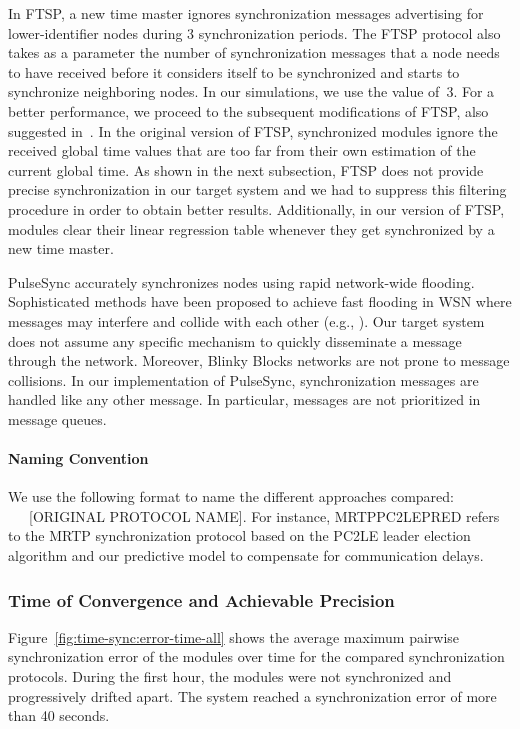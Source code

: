 In FTSP, a new time master ignores synchronization messages advertising for lower-identifier nodes during 3 synchronization periods. The FTSP protocol also takes as a parameter the number of synchronization messages that a node needs to have received before it considers itself to be synchronized and starts to synchronize neighboring nodes. In our simulations, we use the value of~3. For a better performance, we proceed to the subsequent modifications of FTSP, also suggested in~\cite{lenzen2009optimal}. In the original version of FTSP, synchronized modules ignore the received global time values that are too far from their own estimation of the current global time. As shown in the next subsection, FTSP does not provide precise synchronization in our target system and we had to suppress this filtering procedure in order to obtain better results. Additionally, in our version of FTSP, modules clear their linear regression table whenever they get synchronized by a new time master. 

PulseSync accurately synchronizes nodes using rapid network-wide flooding. Sophisticated methods have been proposed to achieve fast flooding in WSN where messages may interfere and collide with each other (e.g., \cite{ferrari2011efficient}). Our target system does not assume any specific mechanism to quickly disseminate a message through the network. Moreover, Blinky Blocks networks are not prone to message collisions. In our implementation of PulseSync, synchronization messages are handled like any other message. In particular, messages are not prioritized in message queues.

\paragraph{Naming Convention}
We use the following format to name the different approaches compared: {\small\ \ \ [ORIGINAL PROTOCOL NAME]}. For instance, MRTP\hyph PC2LE\hyph PRED refers to the MRTP synchronization protocol based on the PC2LE leader election algorithm and our predictive model to compensate for communication delays.

\subsubsection{Time of Convergence and Achievable Precision}

Figure~\ref{fig:time-sync:error-time-all} shows the average maximum pairwise synchronization error of the modules over time for the compared synchronization protocols. During the first hour, the modules were not synchronized and progressively drifted apart. The system reached a synchronization error of more than 40 seconds.

